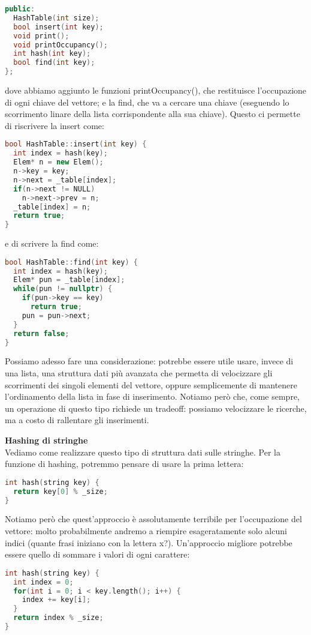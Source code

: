 \documentclass[a4paper,12pt]{article}
\begin{document}
\begin{itemize}
\begin{lstlisting}[language=C++]
public:
  HashTable(int size);
  bool insert(int key);
  void print();
  void printOccupancy();
  int hash(int key);
  bool find(int key);
};
\end{lstlisting}
dove abbiamo aggiunto le funzioni printOccupancy(), che restituisce l'occupazione di ogni chiave del vettore;
e la find, che va a cercare una chiave (eseguendo lo scorrimento linare della lista corrispondente alla sua chiave).
Questo ci permette di riscrivere la insert come:
\begin{lstlisting}[language=C++]
bool HashTable::insert(int key) {
  int index = hash(key);
  Elem* n = new Elem();
  n->key = key;
  n->next = _table[index];
  if(n->next != NULL)
    n->next->prev = n;
  _table[index] = n;
  return true;
}
\end{lstlisting}
e di scrivere la find come:
\begin{lstlisting}[language=C++]
bool HashTable::find(int key) {
  int index = hash(key);
  Elem* pun = _table[index];
  while(pun != nullptr) {
    if(pun->key == key)
      return true;
    pun = pun->next;
  }
  return false;
}
\end{lstlisting}
Possiamo adesso fare una considerazione: potrebbe essere utile usare, invece di una lista, una struttura dati
più avanzata che permetta di velocizzare gli scorrimenti dei singoli elementi del vettore, oppure semplicemente di mantenere l'ordinamento
della lista in fase di inserimento. Notiamo però che, come sempre,
un operazione di questo tipo richiede un tradeoff: possiamo velocizzare le ricerche, ma a costo di rallentare gli inserimenti.
\end{itemize}
\par\smallskip
\textbf{Hashing di stringhe} \\
Vediamo come realizzare questo tipo di struttura dati sulle stringhe. Per la funzione di hashing, potremmo pensare di usare la prima lettera:
\begin{lstlisting}[language=C++]
int hash(string key) {
  return key[0] % _size;
}
\end{lstlisting}
Notiamo però che quest'approccio è assolutamente terribile per l'occupazione del vettore: molto probabilmente andremo a riempire esageratamente
solo alcuni indici (quante frasi iniziano con la lettera x?). Un'approccio migliore potrebbe essere quello di sommare i valori di ogni
carattere:
\begin{lstlisting}[language=C++]
int hash(string key) {
  int index = 0;
  for(int i = 0; i < key.length(); i++) {
    index += key[i];
  }
  return index % _size;
}
\end{lstlisting}
\end{document}
